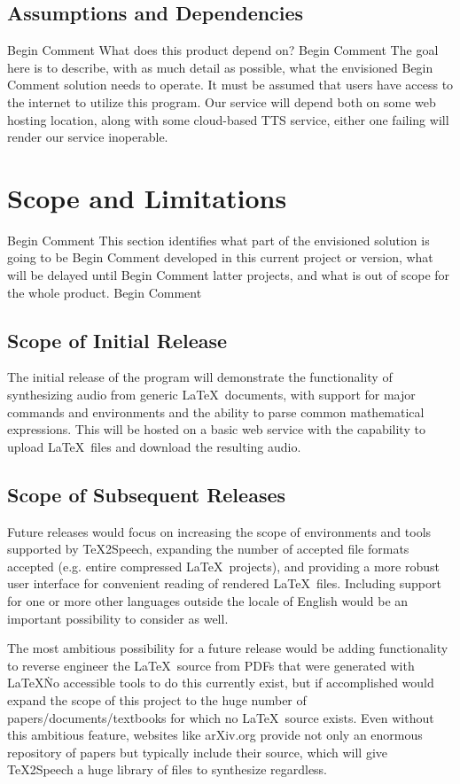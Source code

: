\documentclass[letterpaper,12pt]{article}
\begin{document}
\subsection{Assumptions and Dependencies}
Begin Comment  What does this product depend on?  
Begin Comment  The goal here is to describe, with as much detail as possible, what the envisioned
Begin Comment  solution needs to operate.  
It must be assumed that users have access to the internet to utilize this program. Our service will depend both on some web hosting location, along with some cloud-based TTS service, either one failing will render our service inoperable.

\section{Scope and Limitations}
Begin Comment  This section identifies what part of the envisioned solution is going to be
Begin Comment  developed in this current project or version, what will be delayed until
Begin Comment  latter projects, and what is out of scope for the whole product.  
Begin Comment 
\subsection{Scope of Initial Release}
The initial release of the program will demonstrate the functionality of synthesizing audio from generic \LaTeX\ documents, with support for major commands and environments and the ability to parse common mathematical expressions. This will be hosted on a basic web service with the capability to upload \LaTeX\ files and download the resulting audio.

\subsection{Scope of Subsequent Releases}
\par
Future releases would focus on increasing the scope of environments and tools supported by \TeX 2Speech, expanding the number of accepted file formats accepted (e.g. entire compressed \LaTeX\ projects), and providing a more robust user interface for convenient reading of rendered \LaTeX\ files. Including support for one or more other languages outside the locale of English would be an important possibility to consider as well.\\
\par
\noindent The most ambitious possibility for a future release would be adding functionality to reverse engineer the \LaTeX\ source from PDFs that were generated with \LaTeX\. No accessible tools to do this currently exist, but if accomplished would expand the scope of this project to the huge number of papers/documents/textbooks for which no \LaTeX\ source exists. Even without this ambitious feature, websites like arXiv.org provide not only an enormous repository of papers but typically include their source, which will give \TeX 2Speech a huge library of files to synthesize regardless.
\end{document}
